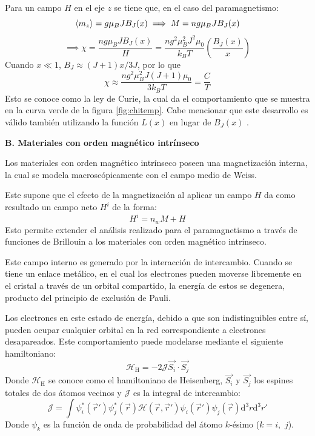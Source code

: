 \documentclass[../main.tex]{subfiles}
\begin{document}
\begin{itemize}
    Para un campo $H$ en el eje $z$ se tiene que, en el caso del paramagnetismo:
    \begin{equation}
            \langle m_z \rangle=g\mu_BJB_J(x) \implies M=ng\mu_B J B_J(x)
        \label{eq:momentozetaparam}
    \end{equation}
    \begin{equation}
        \implies \chi=\dfrac{ng\mu_B J B_J(x)}{H}=\dfrac{n g^2 \mu_B^2 J^2 \mu_0}{k_BT}\left(\dfrac{B_J(x)}{x}\right)
        \label{eq:chiparam}
    \end{equation}
    Cuando $x\ll1$, $B_J\approx(J+1)x/3J$, por lo que
    \begin{equation}
        \chi\approx\dfrac{ng^2\mu_B^2J(J+1)\mu_0}{3k_BT}=\dfrac{C}{T}
        \label{eq:leycurie}
    \end{equation}
    Esto se conoce como la ley de Curie, la cual da el comportamiento que se muestra en la curva verde de la figura \ref{fig:chitemp}. Cabe mencionar que este desarrollo es válido también utilizando la función $L(x)$ en lugar de $B_J(x)$ \cite{coey2010magnetism}.
\end{itemize}
\textbf{B. Materiales con orden magnético intrínseco}

Los materiales con orden magnético intrínseco poseen una magnetización interna, la cual se modela macroscópicamente con el campo medio de Weiss.

Este supone que el efecto de la magnetización al aplicar un campo $H$ da como resultado un campo neto $H^i$ de la forma:
\begin{equation}
    H^i=n_wM+H
    \label{eq:Weiss}
\end{equation}
Esto permite extender el análisis realizado para el paramagnetismo a través de funciones de Brillouin a los materiales con orden magnético intrínseco.

Este campo interno es generado por la interacción de intercambio. Cuando se tiene un enlace metálico, en el cual los electrones pueden moverse libremente en el cristal a través de un orbital compartido, la energía de estos se degenera, producto del principio de exclusión de Pauli.

Los electrones en este estado de energía, debido a que son indistinguibles entre sí, pueden ocupar cualquier orbital en la red correspondiente a electrones desapareados. Este comportamiento puede modelarse mediante el siguiente hamiltoniano:
\begin{equation}
    \mathcal{H}_\text{H}=-2\mathcal{J}\vec{S_i}\cdot\vec{S_j}
    \label{eq:hamiltonianoheisenberg}
\end{equation}
Donde $\mathcal{H}_\text{H}$ se conoce como el hamiltoniano de Heisenberg, $\vec{S_i}$ y $\vec{S_j}$ los espines totales de dos átomos vecinos y $\mathcal{J}$ es la integral de intercambio:
\begin{equation}
    \mathcal{J}=\int \psi^\ast_i(\vec{r}')\psi^\ast_j(\vec{r})\mathcal{H}(\vec{r},\vec{r}')\psi_i(\vec{r}')\psi_j(\vec{r})\text{d}^3r\text{d}^3r'
    \label{eq:intintercambio}
\end{equation}
Donde $\psi_k$ es la función de onda de probabilidad del átomo $k$-ésimo ($k=i,$ $j$).
\end{document}
